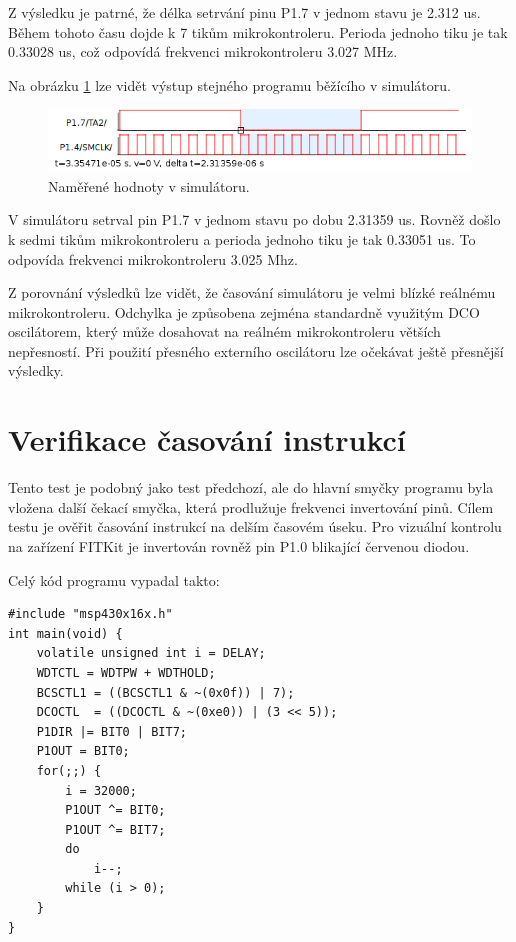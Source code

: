 Z výsledku je patrné, že délka setrvání pinu P1.7 v jednom stavu je 2.312 us. Během tohoto času dojde k 7 tikům mikrokontroleru. Perioda jednoho tiku je tak 0.33028 us, což odpovídá frekvenci mikrokontroleru 3.027 MHz.

Na obrázku \ref{fig:dso04sim} lze vidět výstup stejného programu běžícího v simulátoru.

\begin{figure}[ht]
\centering
\includegraphics[trim=0cm 0cm 0cm 0cm, scale=0.8]{fig/dso04sim}
\caption{Naměřené hodnoty v simulátoru.}
\label{fig:dso04sim}
\end{figure}

V simulátoru setrval pin P1.7 v jednom stavu po dobu 2.31359 us. Rovněž došlo k sedmi tikům mikrokontroleru a perioda jednoho tiku je tak 0.33051 us. To odpovída frekvenci mikrokontroleru 3.025 Mhz.

Z porovnání výsledků lze vidět, že časování simulátoru je velmi blízké reálnému mikrokontroleru. Odchylka je způsobena zejména standardně využitým DCO oscilátorem, který může dosahovat na reálném mikrokontroleru větších nepřesností. Při použití přesného externího oscilátoru lze očekávat ještě přesnější výsledky.

\section{Verifikace časování instrukcí}

Tento test je podobný jako test předchozí, ale do hlavní smyčky programu byla vložena další čekací smyčka, která prodlužuje frekvenci invertování pinů. Cílem testu je ověřit časování instrukcí na delším časovém úseku. Pro vizuální kontrolu na zařízení FITKit je invertován rovněž pin P1.0 blikající červenou diodou.

Celý kód programu vypadal takto:

\lstset{language=XML, numbers=left, frame=single, breaklines=true, tabsize=2, xleftmargin=20pt}
\begin{lstlisting}
#include "msp430x16x.h"
int main(void) {
	volatile unsigned int i = DELAY;
	WDTCTL = WDTPW + WDTHOLD;
	BCSCTL1 = ((BCSCTL1 & ~(0x0f)) | 7);
	DCOCTL  = ((DCOCTL & ~(0xe0)) | (3 << 5));
	P1DIR |= BIT0 | BIT7;
	P1OUT = BIT0;
	for(;;) {
		i = 32000;
		P1OUT ^= BIT0;
		P1OUT ^= BIT7;
		do
			i--;
		while (i > 0);
	}
}
\end{lstlisting}

